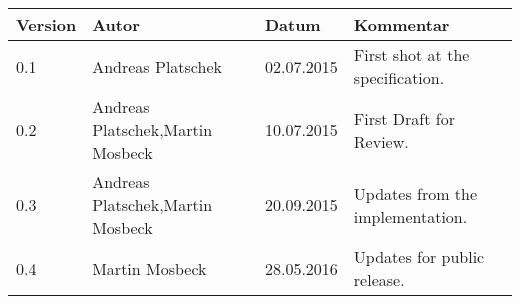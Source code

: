 
\begin{table}[h]
\begin{tabular*}{14.7cm}{|p{}|p{}|p{2cm}|p{}|}
\hline 
Version & Autor & Datum & Kommentar \\[2pt]
\hline
\hline

0.1 & Andreas Platschek & 02.07.2015 & First shot at the specification. \\[2pt]
\hline 
0.2 & Andreas Platschek,\newline Martin Mosbeck & 10.07.2015 & First Draft for Review. \\[2pt]
\hline 
0.3 & Andreas Platschek,\newline Martin Mosbeck & 20.09.2015 & Updates from the implementation. \\[2pt]
\hline 
0.4 & Martin Mosbeck & 28.05.2016 & Updates for public release. \\[2pt]
\hline
\end{tabular*}
\end{table}

